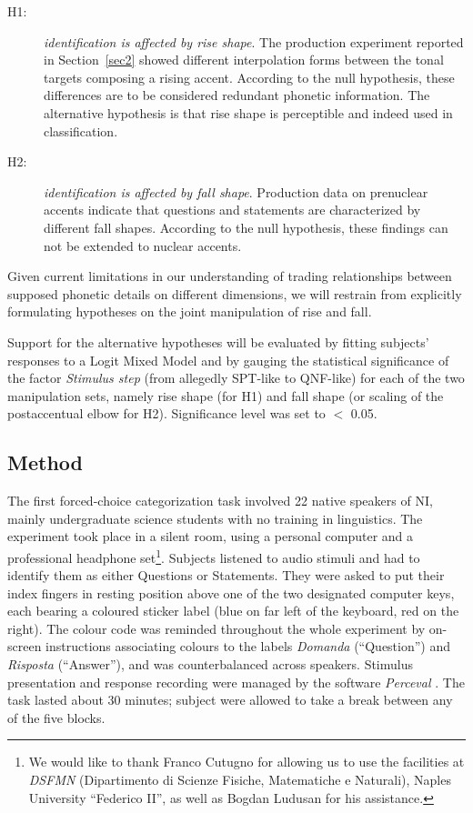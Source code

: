 \begin{description}
   \item[H1:] \textit{identification is affected by rise shape}. The production experiment reported in Section~\ref{sec2} showed different interpolation forms between the tonal targets composing a rising accent. According to the null hypothesis, these differences are to be considered redundant phonetic information. The alternative hypothesis is that rise shape is perceptible and indeed used in classification.
   \item[H2:] \textit{identification is affected by fall shape}. Production data on prenuclear accents indicate that questions and statements are characterized by different fall shapes. According to the null hypothesis, these findings can not be extended to nuclear accents.
\end{description}

Given current limitations in our understanding of trading relationships between supposed phonetic details on different dimensions, we will restrain from explicitly formulating hypotheses on the joint manipulation of rise and fall.

Support for the alternative hypotheses will be evaluated by fitting subjects' responses to a Logit Mixed Model and by gauging the statistical significance of the factor \textit{Stimulus step} (from allegedly SPT-like to QNF-like) for each of the two manipulation sets, namely rise shape (for H1) and fall shape (or scaling of the postaccentual elbow for H2). Significance level was set to $<$ 0.05.

\subsection{Method}\label{sec321}
The first forced-choice categorization task involved 22 native speakers of NI, mainly undergraduate science students with no training in linguistics. The experiment took place in a silent room, using a personal computer and a professional headphone set\footnote{We would like to thank Franco Cutugno for allowing us to use the facilities at \textit{DSFMN} (Dipartimento di Scienze Fisiche, Matematiche e Naturali), Naples University ``Federico II'', as well as Bogdan Ludusan for his assistance.}. Subjects listened to audio stimuli and had to identify them as either Questions or Statements. They were asked to put their index fingers in resting position above one of the two designated computer keys, each bearing a coloured sticker label (blue on far left of the keyboard, red on the right). The colour code was reminded throughout the whole experiment by on-screen instructions associating colours to the labels \textit{Domanda} (``Question'') and \textit{Risposta} (``Answer''), and was counterbalanced across speakers. Stimulus presentation and response recording were managed by the software \textit{Perceval} \citep{andre2003perceval}. The task lasted about 30 minutes; subject were allowed to take a break between any of the five blocks.

